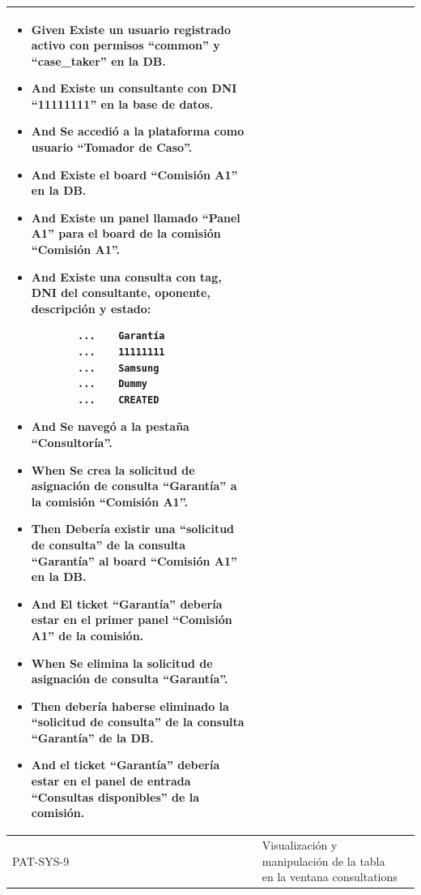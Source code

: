 \begin{longtable}{|p{1cm}|p{2.5cm}|p{12cm}|}
    \begin{itemize}
        \item \textbf{Given} Existe un usuario registrado activo con permisos ``common'' y ``case\_taker'' en la DB.
        \item \textbf{And} Existe un consultante con DNI ``11111111'' en la base de datos.
        \item \textbf{And} Se accedió a la plataforma como usuario ``Tomador de Caso''.
        \item \textbf{And} Existe el board ``Comisión A1'' en la DB.
        \item \textbf{And} Existe un panel llamado ``Panel A1'' para el board de la comisión ``Comisión A1''.
        \item \textbf{And} Existe una consulta con tag, DNI del consultante, oponente, descripción y estado:
        \begin{verbatim}
        ...    Garantía
        ...    11111111
        ...    Samsung
        ...    Dummy
        ...    CREATED
        \end{verbatim}
        \item \textbf{And} Se navegó a la pestaña ``Consultoría''.
        \newline
        \item \textbf{When} Se crea la solicitud de asignación de consulta ``Garant\'ia'' a la comisión ``Comisión A1''.
        \newline
        \item \textbf{Then} Debería existir una ``solicitud de consulta'' de la consulta ``Garant\'ia'' al board ``Comisión A1'' en la DB.
        \item \textbf{And} El ticket ``Garant\'ia'' deber\'ia estar en el primer panel ``Comisión A1'' de la comisión.
        \newline
        \item \textbf{When} Se elimina la solicitud de asignación de consulta ``Garant\'ia''.
        \newline
        \item \textbf{Then} debería haberse eliminado la ``solicitud de consulta'' de la consulta ``Garant\'ia'' de la DB.
        \item \textbf{And} el ticket ``Garant\'ia'' debería estar en el panel de entrada ``Consultas disponibles'' de la comisión.
    \end{itemize}
    \\
    \hline
     PAT-SYS-9 & Visualización y manipulación de la tabla en la ventana consultations &

\end{longtable}
